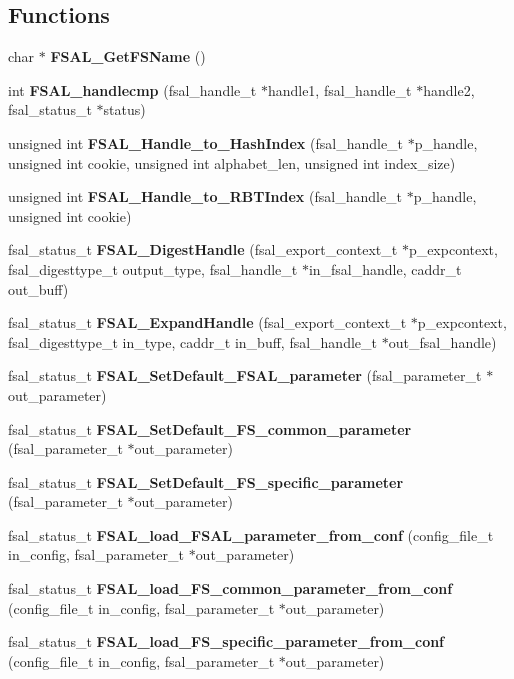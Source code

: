 \subsection*{Functions}
\begin{CompactItemize}
\item 
char $\ast$ {\bf FSAL\_\-Get\-FSName} ()\label{fsal__tools_8c_a4}

\item 
int {\bf FSAL\_\-handlecmp} (fsal\_\-handle\_\-t $\ast$handle1, fsal\_\-handle\_\-t $\ast$handle2, fsal\_\-status\_\-t $\ast$status)
\item 
unsigned int {\bf FSAL\_\-Handle\_\-to\_\-Hash\-Index} (fsal\_\-handle\_\-t $\ast$p\_\-handle, unsigned int cookie, unsigned int alphabet\_\-len, unsigned int index\_\-size)
\item 
unsigned int {\bf FSAL\_\-Handle\_\-to\_\-RBTIndex} (fsal\_\-handle\_\-t $\ast$p\_\-handle, unsigned int cookie)\label{fsal__tools_8c_a7}

\item 
fsal\_\-status\_\-t {\bf FSAL\_\-Digest\-Handle} (fsal\_\-export\_\-context\_\-t $\ast$p\_\-expcontext, fsal\_\-digesttype\_\-t output\_\-type, fsal\_\-handle\_\-t $\ast$in\_\-fsal\_\-handle, caddr\_\-t out\_\-buff)
\item 
fsal\_\-status\_\-t {\bf FSAL\_\-Expand\-Handle} (fsal\_\-export\_\-context\_\-t $\ast$p\_\-expcontext, fsal\_\-digesttype\_\-t in\_\-type, caddr\_\-t in\_\-buff, fsal\_\-handle\_\-t $\ast$out\_\-fsal\_\-handle)
\item 
fsal\_\-status\_\-t {\bf FSAL\_\-Set\-Default\_\-FSAL\_\-parameter} (fsal\_\-parameter\_\-t $\ast$out\_\-parameter)
\item 
fsal\_\-status\_\-t {\bf FSAL\_\-Set\-Default\_\-FS\_\-common\_\-parameter} (fsal\_\-parameter\_\-t $\ast$out\_\-parameter)\label{fsal__tools_8c_a11}

\item 
fsal\_\-status\_\-t {\bf FSAL\_\-Set\-Default\_\-FS\_\-specific\_\-parameter} (fsal\_\-parameter\_\-t $\ast$out\_\-parameter)\label{fsal__tools_8c_a12}

\item 
fsal\_\-status\_\-t {\bf FSAL\_\-load\_\-FSAL\_\-parameter\_\-from\_\-conf} (config\_\-file\_\-t in\_\-config, fsal\_\-parameter\_\-t $\ast$out\_\-parameter)
\item 
fsal\_\-status\_\-t {\bf FSAL\_\-load\_\-FS\_\-common\_\-parameter\_\-from\_\-conf} (config\_\-file\_\-t in\_\-config, fsal\_\-parameter\_\-t $\ast$out\_\-parameter)\label{fsal__tools_8c_a14}

\item 
fsal\_\-status\_\-t {\bf FSAL\_\-load\_\-FS\_\-specific\_\-parameter\_\-from\_\-conf} (config\_\-file\_\-t in\_\-config, fsal\_\-parameter\_\-t $\ast$out\_\-parameter)\label{fsal__tools_8c_a15}

\end{CompactItemize}


